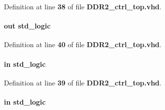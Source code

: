 Definition at line {\bf 38} of file {\bf D\+D\+R2\+\_\+ctrl\+\_\+top.\+vhd}.

\paragraph[{rcmd\+\_\+rdy}]{ {\bfseries \textcolor{keywordflow}{out}\textcolor{vhdlchar}{ }} {\bfseries \textcolor{comment}{std\+\_\+logic}\textcolor{vhdlchar}{ }} \hspace{0.3cm}{\ttfamily [Port]}}\label{classDDR2__ctrl__top_a8fbdf5cdd5ec761f59ff9f70a889e216}


Definition at line {\bf 40} of file {\bf D\+D\+R2\+\_\+ctrl\+\_\+top.\+vhd}.

\paragraph[{rcmd\+\_\+reset\+\_\+n}]{ {\bfseries \textcolor{keywordflow}{in}\textcolor{vhdlchar}{ }} {\bfseries \textcolor{comment}{std\+\_\+logic}\textcolor{vhdlchar}{ }} \hspace{0.3cm}{\ttfamily [Port]}}\label{classDDR2__ctrl__top_af69092233cc111b9f7592413282f334a}


Definition at line {\bf 39} of file {\bf D\+D\+R2\+\_\+ctrl\+\_\+top.\+vhd}.

\paragraph[{rcmd\+\_\+wr}]{ {\bfseries \textcolor{keywordflow}{in}\textcolor{vhdlchar}{ }} {\bfseries \textcolor{comment}{std\+\_\+logic}\textcolor{vhdlchar}{ }} \hspace{0.3cm}{\ttfamily [Port]}}\label{classDDR2__ctrl__top_ae23ad91faa5f8b4b2f2a4a38f8a61194}


